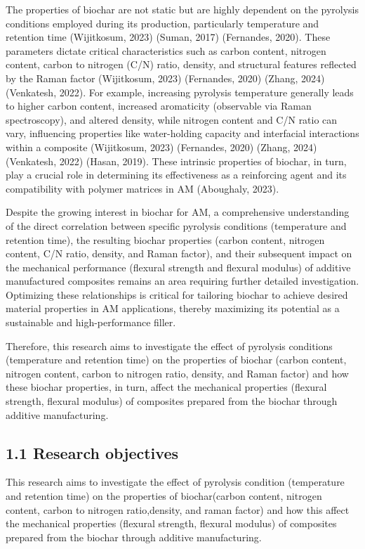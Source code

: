 \documentclass[
]{article}
\begin{document}
The properties of biochar are not static but are highly dependent on the
pyrolysis conditions employed during its production, particularly
temperature and retention time (Wijitkosum, 2023) (Suman, 2017)
(Fernandes, 2020). These parameters dictate critical characteristics
such as carbon content, nitrogen content, carbon to nitrogen (C/N)
ratio, density, and structural features reflected by the Raman factor
(Wijitkosum, 2023) (Fernandes, 2020) (Zhang, 2024) (Venkatesh, 2022).
For example, increasing pyrolysis temperature generally leads to higher
carbon content, increased aromaticity (observable via Raman
spectroscopy), and altered density, while nitrogen content and C/N ratio
can vary, influencing properties like water-holding capacity and
interfacial interactions within a composite (Wijitkosum, 2023)
(Fernandes, 2020) (Zhang, 2024) (Venkatesh, 2022) (Hasan, 2019). These
intrinsic properties of biochar, in turn, play a crucial role in
determining its effectiveness as a reinforcing agent and its
compatibility with polymer matrices in AM (Aboughaly, 2023).

Despite the growing interest in biochar for AM, a comprehensive
understanding of the direct correlation between specific pyrolysis
conditions (temperature and retention time), the resulting biochar
properties (carbon content, nitrogen content, C/N ratio, density, and
Raman factor), and their subsequent impact on the mechanical performance
(flexural strength and flexural modulus) of additive manufactured
composites remains an area requiring further detailed investigation.
Optimizing these relationships is critical for tailoring biochar to
achieve desired material properties in AM applications, thereby
maximizing its potential as a sustainable and high-performance filler.

Therefore, this research aims to investigate the effect of pyrolysis
conditions (temperature and retention time) on the properties of biochar
(carbon content, nitrogen content, carbon to nitrogen ratio, density,
and Raman factor) and how these biochar properties, in turn, affect the
mechanical properties (flexural strength, flexural modulus) of
composites prepared from the biochar through additive manufacturing.

\subsection{1.1 Research objectives}\label{research-objectives}

This research aims to investigate the effect of pyrolysis condition
(temperature and retention time) on the properties of biochar(carbon
content, nitrogen content, carbon to nitrogen ratio,density, and raman
factor) and how this affect the mechanical properties (flexural
strength, flexural modulus) of composites prepared from the biochar
through additive manufacturing.
\end{document}

